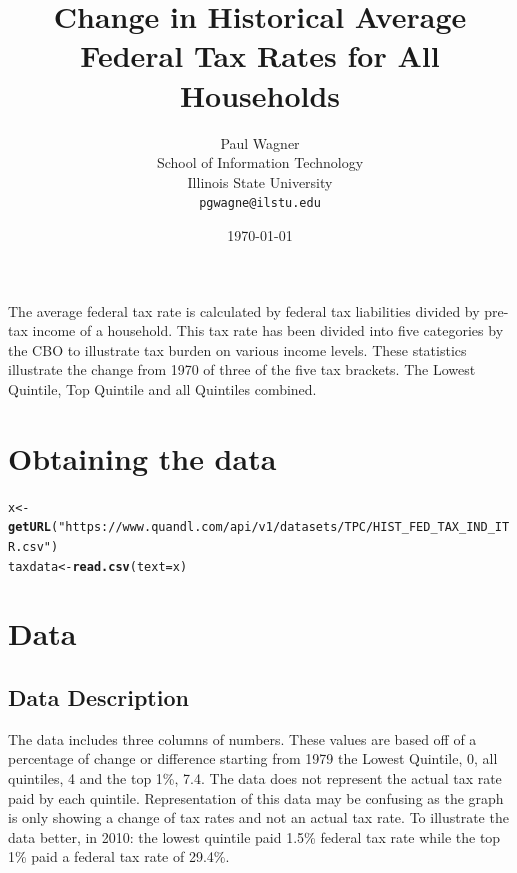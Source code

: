 \documentclass{article}\usepackage[]{graphicx}\usepackage[]{color}
\makeatletter
\newcommand{\hlstr}[1]{\textcolor[rgb]{0.192,0.494,0.8}{#1}}%
\newcommand{\hlstd}[1]{\textcolor[rgb]{0.345,0.345,0.345}{#1}}%
\newcommand{\hlkwb}[1]{\textcolor[rgb]{0.69,0.353,0.396}{#1}}%
\newcommand{\hlkwc}[1]{\textcolor[rgb]{0.333,0.667,0.333}{#1}}%
\newcommand{\hlkwd}[1]{\textcolor[rgb]{0.737,0.353,0.396}{\textbf{#1}}}%
\newenvironment{kframe}{%
 \def\at@end@of@kframe{}%
 \ifinner\ifhmode%
  \def\at@end@of@kframe{\end{minipage}}%
  \begin{minipage}{\columnwidth}%
 \fi\fi%
 \def\FrameCommand##1{\hskip\@totalleftmargin \hskip-\fboxsep
 \colorbox{shadecolor}{##1}\hskip-\fboxsep
     \hskip-\linewidth \hskip-\@totalleftmargin \hskip\columnwidth}%
 \MakeFramed {\advance\hsize-\width
   \@totalleftmargin\z@ \linewidth\hsize
   \@setminipage}}%
 {\par\unskip\endMakeFramed%
 \at@end@of@kframe}
\newenvironment{knitrout}{}{} %
\makeatother
\begin{document}
\title {Change in Historical Average Federal Tax Rates for All Households} 
\author { Paul Wagner  
\\ School of Information Technology 
\\ Illinois State University
\\
\texttt{pgwagne@ilstu.edu}}
\date{\today} 
\maketitle

The average federal tax rate is calculated by federal tax liabilities divided by pre-tax income of a household. This tax rate has been divided into five categories by the CBO to illustrate tax burden on various income levels. These statistics illustrate the change from 1970 of three of the five tax brackets. The Lowest Quintile, Top Quintile and all Quintiles combined. 

\section{Obtaining the data}



\begin{knitrout}
\color{fgcolor}\begin{kframe}
\begin{alltt}
\hlstd{x} \hlkwb{<-} \hlkwd{getURL}\hlstd{(}\hlstr{"https://www.quandl.com/api/v1/datasets/TPC/HIST_FED_TAX_IND_ITR.csv"}\hlstd{)}
\hlstd{taxdata} \hlkwb{<-} \hlkwd{read.csv}\hlstd{(}\hlkwc{text} \hlstd{= x)}
\end{alltt}
\end{kframe}
\end{knitrout}

\section{Data}

\subsection{Data Description}

The data includes three columns of numbers. These values are based off of a percentage of change or difference starting from 1979 the Lowest Quintile, 0, all quintiles, 4 and the top 1\%, 7.4. The data does not represent the actual tax rate paid by each quintile. Representation of this data may be confusing as the graph is only showing a change of tax rates and not an actual tax rate. To illustrate the data better, in 2010: the lowest quintile paid 1.5\% federal tax rate while the top 1\% paid a federal tax rate of 29.4\%.
\end{document}
